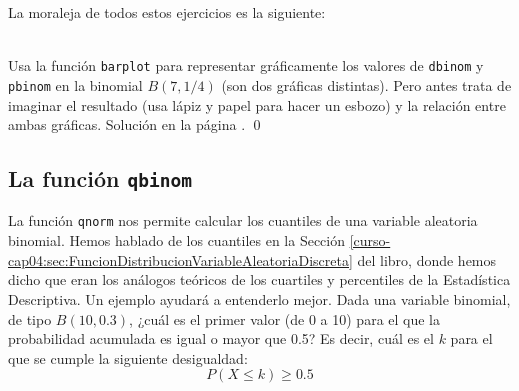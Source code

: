 \documentclass[10pt,a4paper]{article}\usepackage[]{graphicx}\usepackage[]{color}
\begin{document}
La moraleja de todos estos ejercicios es la siguiente:
        \begin{center}
        \end{center}

\begin{ejercicio}
\label{tut05:ejercicio03}
\quad\\
Usa la función {\tt barplot} para representar gráficamente los valores de {\tt dbinom} y {\tt pbinom} en la binomial $B(7,1/4)$ (son dos gráficas distintas). Pero antes trata de imaginar el resultado (usa lápiz y papel para hacer un esbozo) y la relación entre ambas gráficas.
Solución en la página \pageref{tut05:ejercicio03:sol}.
\qed
\end{ejercicio}

\subsection{La función {\tt qbinom}}
\label{tut05:subsec:FuncionQbinom}

La función {\tt qnorm} nos permite calcular los cuantiles de una variable aleatoria binomial. Hemos hablado de los cuantiles en la Sección \ref{curso-cap04:sec:FuncionDistribucionVariableAleatoriaDiscreta} del libro, donde hemos dicho que eran  los análogos teóricos de los cuartiles y percentiles de la Estadística Descriptiva. Un ejemplo ayudará a entenderlo mejor. Dada una variable binomial, de tipo $B(10,0.3)$, ¿cuál es el primer valor (de 0 a 10) para el que la probabilidad acumulada es igual o mayor que 0.5? Es decir, cuál es el $k$ para el que se cumple la siguiente desigualdad:
\[P(X \leq k)\geq 0.5\]
\end{document}
